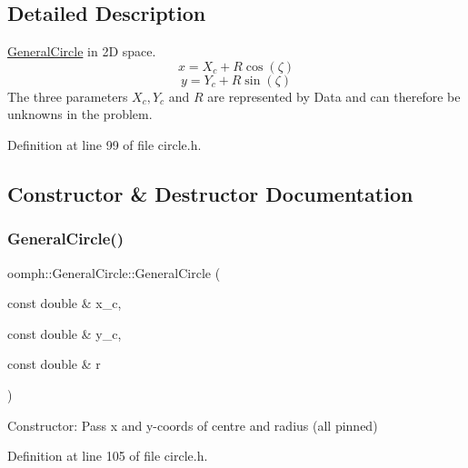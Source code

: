 \subsection{Detailed Description}
\hyperlink{classoomph_1_1GeneralCircle}{General\+Circle} in 2D space. \[ x = X_c + R \cos(\zeta) \] \[ y = Y_c + R \sin(\zeta) \] The three parameters $ X_c, Y_c $ and $ R $ are represented by Data and can therefore be unknowns in the problem. 

Definition at line 99 of file circle.\+h.



\subsection{Constructor \& Destructor Documentation}
\mbox{\label{classoomph_1_1GeneralCircle_aa4847492eeebdc2033c82734d7bcf2f2}} 
\subsubsection{\texorpdfstring{General\+Circle()}{GeneralCircle()}\hspace{0.1cm}{\footnotesize\ttfamily [1/2]}}
{\footnotesize\ttfamily oomph\+::\+General\+Circle\+::\+General\+Circle (\begin{DoxyParamCaption}\item[{const double \&}]{x\+\_\+c,  }\item[{const double \&}]{y\+\_\+c,  }\item[{const double \&}]{r }\end{DoxyParamCaption})\hspace{0.3cm}{\ttfamily [inline]}}



Constructor\+: Pass x and y-\/coords of centre and radius (all pinned) 



Definition at line 105 of file circle.\+h.

\mbox{\label{classoomph_1_1GeneralCircle_afdcca2cddb52a51abc693c7d7ba6b173}} 
